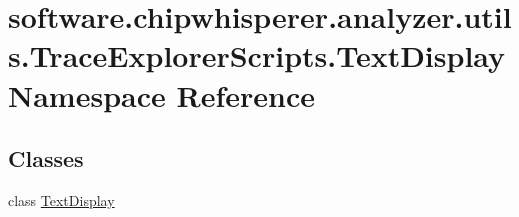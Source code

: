 \hypertarget{namespacesoftware_1_1chipwhisperer_1_1analyzer_1_1utils_1_1TraceExplorerScripts_1_1TextDisplay}{}\section{software.\+chipwhisperer.\+analyzer.\+utils.\+Trace\+Explorer\+Scripts.\+Text\+Display Namespace Reference}
\label{namespacesoftware_1_1chipwhisperer_1_1analyzer_1_1utils_1_1TraceExplorerScripts_1_1TextDisplay}
\subsection*{Classes}
\begin{DoxyCompactItemize}
\item 
class \hyperlink{classsoftware_1_1chipwhisperer_1_1analyzer_1_1utils_1_1TraceExplorerScripts_1_1TextDisplay_1_1TextDisplay}{Text\+Display}
\end{DoxyCompactItemize}
